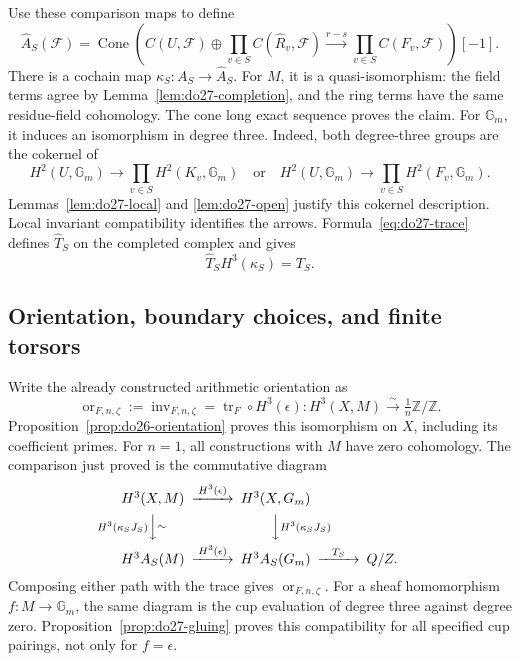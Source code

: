 Use these comparison maps to define
\[
 \widehat A_S(\mathcal F)=
 \operatorname{Cone}\left(
 C(U,\mathcal F)\oplus
 \prod_{v\in S}C(\widehat R_v,\mathcal F)
 \xrightarrow{r-s}\prod_{v\in S}C(F_v,\mathcal F)
 \right)[-1].
\]
There is a cochain map \(\kappa_S:A_S\to\widehat A_S\).
For \(M\), it is a quasi-isomorphism: the field terms agree by
Lemma~\ref{lem:do27-completion}, and the ring terms have the same
residue-field cohomology. The cone long exact sequence proves the
claim. For \(\mathbb G_m\), it induces an isomorphism in degree
three. Indeed, both degree-three groups are the cokernel of
\[
 H^2(U,\mathbb G_m)\longrightarrow
          \prod_{v\in S}H^2(K_v,\mathbb G_m)
 \quad\text{or}\quad
 H^2(U,\mathbb G_m)\longrightarrow
          \prod_{v\in S}H^2(F_v,\mathbb G_m).
\]
Lemmas~\ref{lem:do27-local} and \ref{lem:do27-open} justify this
cokernel description. Local invariant compatibility identifies the
arrows. Formula~\eqref{eq:do27-trace} defines \(\widehat T_S\)
on the completed complex and gives
\[
 \widehat T_S H^3(\kappa_S)=T_S.
\]

\subsection{Orientation, boundary choices, and finite torsors}

Write the already constructed arithmetic orientation as
\[
 \operatorname{or}_{F,n,\zeta}
 :=\operatorname{inv}_{F,n,\zeta}
 =\operatorname{tr}_F\circ H^3(\epsilon):
 H^3(X,M)\xrightarrow{\sim}\tfrac1n\mathbb Z/\mathbb Z.
\]
Proposition~\ref{prop:do26-orientation} proves this isomorphism on
\(X\), including its coefficient primes.
For \(n=1\), all constructions with \(M\) have zero cohomology.
The comparison just proved is the commutative diagram
\begin{equation}
\label{eq:do27-comparison}
\begin{CD}
 H^3(X,M) @>{H^3(\epsilon)}>> H^3(X,\mathbb G_m)\\
 @V{H^3(\kappa_SJ_S)}V{\sim}V @VV{H^3(\kappa_SJ_S)}V\\
 H^3\widehat A_S(M) @>{H^3(\epsilon)}>>
 H^3\widehat A_S(\mathbb G_m) @>{\widehat T_S}>> \mathbb Q/\mathbb Z.
\end{CD}
\end{equation}
Composing either path with the trace gives
\(\operatorname{or}_{F,n,\zeta}\).
For a sheaf homomorphism \(f:M\to\mathbb G_m\), the same diagram
is the cup evaluation of degree three against degree zero.
Proposition~\ref{prop:do27-gluing} proves this compatibility for all
specified cup pairings, not only for \(f=\epsilon\).

